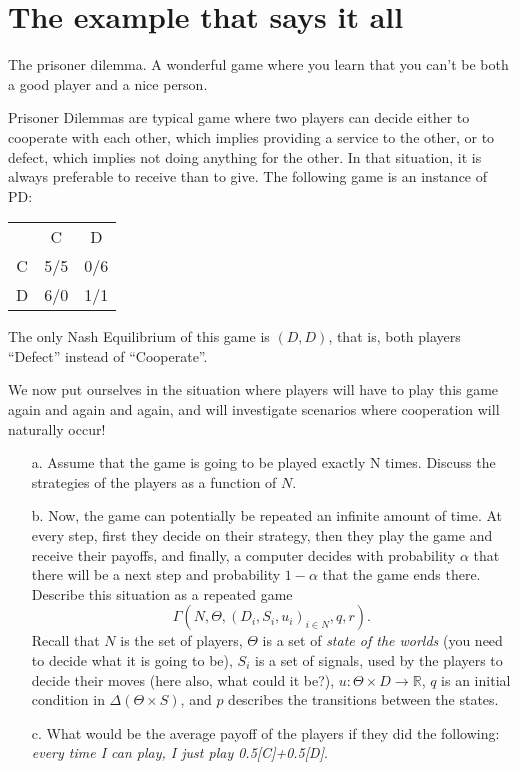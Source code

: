 \documentclass{../ape}
\newcommand{\reels}{\mathbb{R}}
\begin{document}

\section{The example that says it all}
The prisoner dilemma. A wonderful game where you learn that you can't be both a good player and a nice person.

Prisoner Dilemmas are typical game where two players can decide either to cooperate with each other, which implies providing a service to the other, or to defect, which implies not doing anything for the other. In that situation, it is always preferable to receive than to give. The following game is an instance of PD:
\begin{center}
\begin{tabular}{c|cc}
& C & D \\
C & 5/5 & 0/6 \\
D & 6/0 & 1/1
\end{tabular}
\end{center}
The only Nash Equilibrium of this game is $(D,D)$, that is, both players ``Defect'' instead of ``Cooperate''.

We now put ourselves in the situation where players will have to play this game again and again and again, and will investigate scenarios where cooperation will naturally occur!
\begin{enumerate}
	\item[a.] Assume that the game is going to be played exactly N times. Discuss the strategies of the players as a function of $N$. 
	\item[b.] Now, the game can potentially be repeated an infinite amount of time. At every step, first they decide on their strategy, then they play the game and receive their payoffs, and finally, a computer decides with probability $\alpha$ that there will be a next step and probability $1-\alpha$ that the game ends there.\\
	Describe this situation as a repeated game $$\Gamma(N, \Theta, (D_i, S_i, u_i)_{i \in N}, q, r).$$
	Recall that $N$ is the set of players, $\Theta$ is a set of \emph{state of the worlds} (you need to decide what it is going to be), $S_i$ is a set of signals, used by the players to decide their moves (here also, what could it be?), $u : \Theta \times D \rightarrow \reels$, $q$ is an initial condition in $\Delta( \Theta \times S)$, and $p$ describes the transitions between the states.
	\item[c.] What would be the average payoff of the players if they did the following:
		\emph{every time I can play, I just play 0.5[C]+0.5[D]}. 
\end{enumerate}
\end{document}
